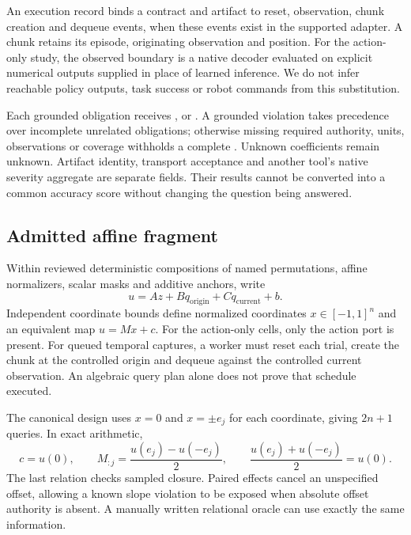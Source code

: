 An execution record binds a contract and artifact to reset, observation, chunk creation and dequeue events, when these events exist in the supported adapter. A chunk retains its episode, originating observation and position. For the action-only study, the observed boundary is a native decoder evaluated on explicit numerical outputs supplied in place of learned inference. We do not infer reachable policy outputs, task success or robot commands from this substitution.

Each grounded obligation receives \PASS{}, \FAIL{} or \UNKNOWN{}. A grounded violation takes precedence over incomplete unrelated obligations; otherwise missing required authority, units, observations or coverage withholds a complete \PASS{}. Unknown coefficients remain unknown. Artifact identity, transport acceptance and another tool's native severity aggregate are separate fields. Their results cannot be converted into a common accuracy score without changing the question being answered.

\subsection{Admitted affine fragment}
Within reviewed deterministic compositions of named permutations, affine normalizers, scalar masks and additive anchors, write
\begin{equation}
 u = A z + Bq_{\mathrm{origin}} + Cq_{\mathrm{current}} + b.
 \label{eq:boundary}
\end{equation}
Independent coordinate bounds define normalized coordinates $x\in[-1,1]^n$ and an equivalent map $u=Mx+c$. For the action-only cells, only the action port is present. For queued temporal captures, a worker must reset each trial, create the chunk at the controlled origin and dequeue against the controlled current observation. An algebraic query plan alone does not prove that schedule executed.

The canonical design uses $x=0$ and $x=\pm e_j$ for each coordinate, giving $2n+1$ queries. In exact arithmetic,
\begin{equation}
 c=u(0),\qquad M_{:j}=\frac{u(e_j)-u(-e_j)}{2},\qquad
 \frac{u(e_j)+u(-e_j)}{2}=u(0).
 \label{eq:contrast}
\end{equation}
The last relation checks sampled closure. Paired effects cancel an unspecified offset, allowing a known slope violation to be exposed when absolute offset authority is absent. A manually written relational oracle can use exactly the same information.

